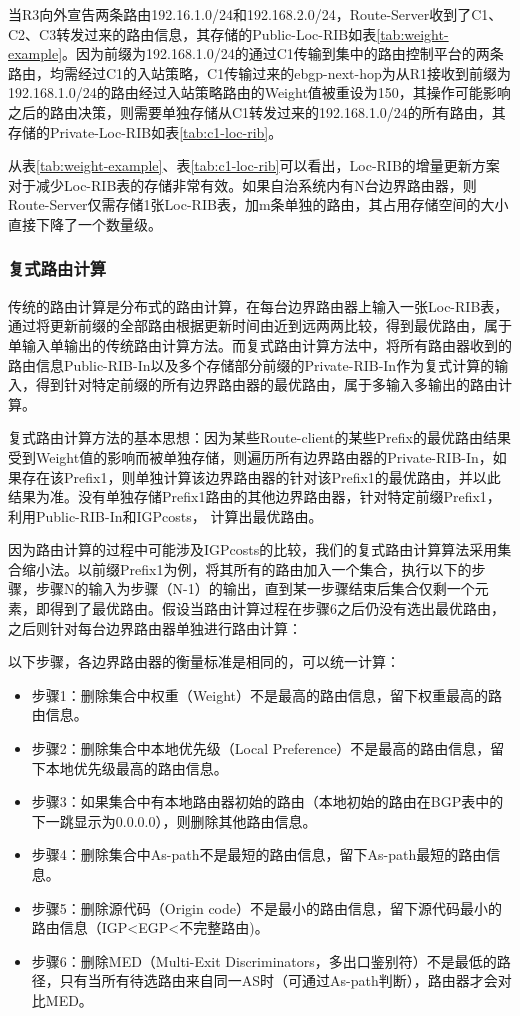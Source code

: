 当R3向外宣告两条路由192.16.1.0/24和192.168.2.0/24，Route-Server收到了C1、C2、C3转发过来的路由信息，其存储的Public-Loc-RIB如表\ref{tab:weight-example}。因为前缀为192.168.1.0/24的通过C1传输到集中的路由控制平台的两条路由，均需经过C1的入站策略，C1传输过来的ebgp-next-hop为从R1接收到前缀为192.168.1.0/24的路由经过入站策略路由的Weight值被重设为150，其操作可能影响之后的路由决策，则需要单独存储从C1转发过来的192.168.1.0/24的所有路由，其存储的Private-Loc-RIB如表\ref{tab:c1-loc-rib}。


从表\ref{tab:weight-example}、表\ref{tab:c1-loc-rib}可以看出，Loc-RIB的增量更新方案对于减少Loc-RIB表的存储非常有效。如果自治系统内有N台边界路由器，则Route-Server仅需存储1张Loc-RIB表，加m条单独的路由，其占用存储空间的大小直接下降了一个数量级。


\subsubsection{复式路由计算}

传统的路由计算是分布式的路由计算，在每台边界路由器上输入一张Loc-RIB表，通过将更新前缀的全部路由根据更新时间由近到远两两比较，得到最优路由，属于单输入单输出的传统路由计算方法。而复式路由计算方法中，将所有路由器收到的路由信息Public-RIB-In以及多个存储部分前缀的Private-RIB-In作为复式计算的输入，得到针对特定前缀的所有边界路由器的最优路由，属于多输入多输出的路由计算。

复式路由计算方法的基本思想：因为某些Route-client的某些Prefix的最优路由结果受到Weight值的影响而被单独存储，则遍历所有边界路由器的Private-RIB-In，如果存在该Prefix1，则单独计算该边界路由器的针对该Prefix1的最优路由，并以此结果为准。没有单独存储Prefix1路由的其他边界路由器，针对特定前缀Prefix1，利用Public-RIB-In和IGPcosts， 计算出最优路由。

因为路由计算的过程中可能涉及IGPcosts的比较，我们的复式路由计算算法采用集合缩小法。以前缀Prefix1为例，将其所有的路由加入一个集合，执行以下的步骤，步骤N的输入为步骤（N-1）的输出，直到某一步骤结束后集合仅剩一个元素，即得到了最优路由。假设当路由计算过程在步骤6之后仍没有选出最优路由，之后则针对每台边界路由器单独进行路由计算：

以下步骤，各边界路由器的衡量标准是相同的，可以统一计算：
\begin{itemize}
    \item 步骤1：删除集合中权重（Weight）不是最高的路由信息，留下权重最高的路由信息。
    \item 步骤2：删除集合中本地优先级（Local Preference）不是最高的路由信息，留下本地优先级最高的路由信息。
    \item 步骤3：如果集合中有本地路由器初始的路由（本地初始的路由在BGP表中的下一跳显示为0.0.0.0），则删除其他路由信息。
    \item 步骤4：删除集合中As-path不是最短的路由信息，留下As-path最短的路由信息。
    \item 步骤5：删除源代码（Origin code）不是最小的路由信息，留下源代码最小的路由信息（IGP<EGP<不完整路由)。
    \item 步骤6：删除MED（Multi-Exit Discriminators，多出口鉴别符）不是最低的路径，只有当所有待选路由来自同一AS时（可通过As-path判断），路由器才会对比MED。
\end{itemize}


